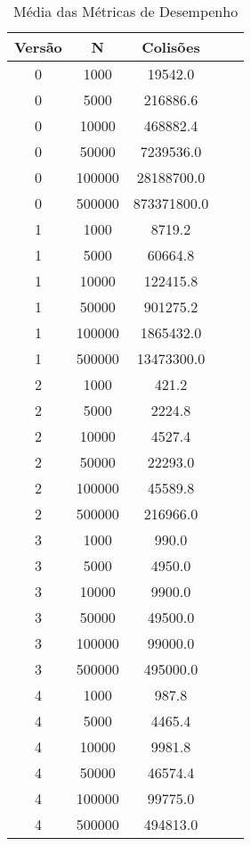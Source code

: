 \begin{table}[htbp]
\caption{Média das Métricas de Desempenho}
\label{tab:table4}
\begin{tabular}{c|c|c|c|c}
\textbf{Versão} & \textbf{N} & \textbf{Colisões}\\
\hline
0 & 1000 & 19542.0 \\
0 & 5000 & 216886.6 \\
0 & 10000 & 468882.4 \\
0 & 50000 & 7239536.0 \\
0 & 100000 & 28188700.0 \\
0 & 500000 & 873371800.0 \\
1 & 1000 & 8719.2 \\
1 & 5000 & 60664.8 \\
1 & 10000 & 122415.8 \\
1 & 50000 & 901275.2 \\
1 & 100000 & 1865432.0 \\
1 & 500000 & 13473300.0 \\
2 & 1000 & 421.2 \\
2 & 5000 & 2224.8 \\
2 & 10000 & 4527.4 \\
2 & 50000 & 22293.0 \\
2 & 100000 & 45589.8 \\
2 & 500000 & 216966.0 \\
3 & 1000 & 990.0 \\
3 & 5000 & 4950.0 \\
3 & 10000 & 9900.0 \\
3 & 50000 & 49500.0 \\
3 & 100000 & 99000.0 \\
3 & 500000 & 495000.0 \\
4 & 1000 & 987.8 \\
4 & 5000 & 4465.4 \\
4 & 10000 & 9981.8 \\
4 & 50000 & 46574.4 \\
4 & 100000 & 99775.0 \\
4 & 500000 & 494813.0 \\
\end{tabular}
\end{table}

